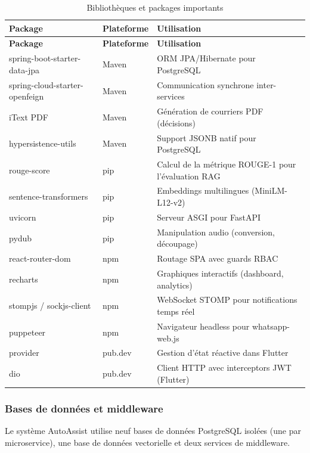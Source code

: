 \begin{longtable}{|p{4cm}|p{2cm}|p{6.5cm}|}
\caption{Biblioth\`{e}ques et packages importants} \label{tab:packages} \\
\hline
\textbf{Package} & \textbf{Plateforme} & \textbf{Utilisation} \\
\hline
\endfirsthead
\hline \textbf{Package} & \textbf{Plateforme} & \textbf{Utilisation} \\ \hline
\endhead
spring-boot-starter-data-jpa & Maven & ORM JPA/Hibernate pour PostgreSQL \\
\hline
spring-cloud-starter-openfeign & Maven & Communication synchrone inter-services \\
\hline
iText PDF & Maven & G\'{e}n\'{e}ration de courriers PDF (d\'{e}cisions) \\
\hline
hypersistence-utils & Maven & Support JSONB natif pour PostgreSQL \\
\hline
rouge-score & pip & Calcul de la m\'{e}trique ROUGE-1 pour l'\'{e}valuation RAG \\
\hline
sentence-transformers & pip & Embeddings multilingues (MiniLM-L12-v2) \\
\hline
uvicorn & pip & Serveur ASGI pour FastAPI \\
\hline
pydub & pip & Manipulation audio (conversion, d\'{e}coupage) \\
\hline
react-router-dom & npm & Routage SPA avec guards RBAC \\
\hline
recharts & npm & Graphiques interactifs (dashboard, analytics) \\
\hline
stompjs / sockjs-client & npm & WebSocket STOMP pour notifications temps r\'{e}el \\
\hline
puppeteer & npm & Navigateur headless pour whatsapp-web.js \\
\hline
provider & pub.dev & Gestion d'\'{e}tat r\'{e}active dans Flutter \\
\hline
dio & pub.dev & Client HTTP avec interceptors JWT (Flutter) \\
\hline
\end{longtable}

\subsubsection{Bases de donn\'{e}es et middleware}

Le syst\`{e}me AutoAssist utilise neuf bases de donn\'{e}es PostgreSQL isol\'{e}es (une par microservice), une base de donn\'{e}es vectorielle et deux services de middleware.

